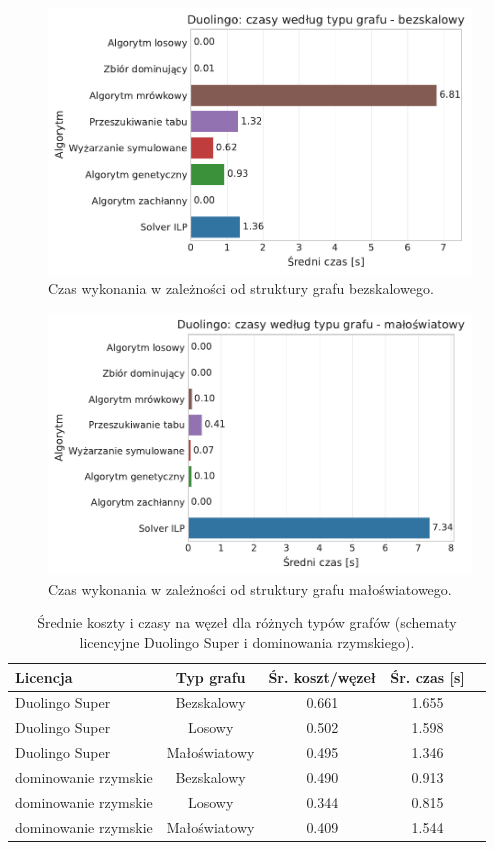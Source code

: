 \begin{figure}[H]
  \centering
  \includegraphics[width=0.65\linewidth]{assets/figures/benchmark/synthetic/duolingo_time_by_graph_scale_free.pdf}
  \caption{Czas wykonania w zależności od struktury grafu bezskalowego.}
  \label{fig:duo-synth-time-scale-free}
\end{figure}

\begin{figure}[H]
  \centering
  \includegraphics[width=0.65\linewidth]{assets/figures/benchmark/synthetic/duolingo_time_by_graph_small_world.pdf}
  \caption{Czas wykonania w zależności od struktury grafu małoświatowego.}
  \label{fig:duo-synth-time-small-world}
\end{figure}

\begin{table}[H]
  \centering
  \caption{Średnie koszty i czasy na węzeł dla różnych typów grafów (schematy licencyjne Duolingo Super i dominowania rzymskiego).}
  \label{tab:duo-synth-summary-times}
  \begin{tabular}{lcccc}
    \toprule
    \textbf{Licencja}    & \textbf{Typ grafu} & \textbf{Śr. koszt/węzeł} & \textbf{Śr. czas [s]} \\
    \midrule
    Duolingo Super       & Bezskalowy         & 0.661                    & 1.655                 \\
    Duolingo Super       & Losowy             & 0.502                    & 1.598                 \\
    Duolingo Super       & Małoświatowy       & 0.495                    & 1.346                 \\
    dominowanie rzymskie & Bezskalowy         & 0.490                    & 0.913                 \\
    dominowanie rzymskie & Losowy             & 0.344                    & 0.815                 \\
    dominowanie rzymskie & Małoświatowy       & 0.409                    & 1.544                 \\
    \bottomrule
  \end{tabular}
\end{table}



